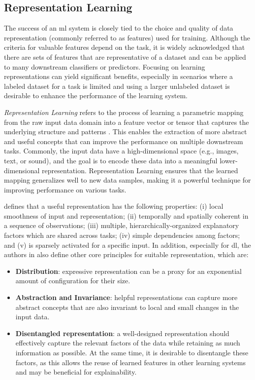 \subsection{Representation Learning}

The success of an \acs{ml} system is closely tied to the choice and quality of data representation (commonly referred to as features) used for training. Although the criteria for valuable features depend on the task, it is widely acknowledged that there are sets of features that are representative of a dataset and can be applied to many downstream classifiers or predictors. Focusing on learning representations can yield significant benefits, especially in scenarios where a labeled dataset for a task is limited and using a larger unlabeled dataset is desirable to enhance the performance of the learning system.

\textit{Representation Learning} refers to the process of learning a parametric mapping from the raw input data domain into a feature vector or tensor that captures the underlying structure and patterns \citep{le2020contrastive}. This enables the extraction of more abstract and useful concepts that can improve the performance on multiple downstream tasks. Commonly, the input data have a high-dimensional space (e.g., images, text, or sound), and the goal is to encode these data into a meaningful lower-dimensional representation. Representation Learning ensures that the learned mapping generalizes well to new data samples, making it a powerful technique for improving performance on various tasks.

\cite{bengio2013representation} defines that a useful representation has the following properties: (i) local smoothness of input and representation; (ii) temporally and spatially coherent in a sequence of observations; (iii) multiple, hierarchically-organized explanatory factors which are shared across tasks; (iv) simple dependencies among factors; and (v) is sparsely activated for a specific input. In addition, especially for \acl{dl}, the authors in \citep{le2020contrastive} also define other core principles for suitable representation, which are:

\begin{itemize}
\item \textbf{Distribution}: expressive representation can be a proxy for an exponential amount of configuration for their size.

\item \textbf{Abstraction and Invariance}: helpful representations can capture more abstract concepts that are also invariant to local and small changes in the input data.

\item \textbf{Disentangled representation}: a well-designed representation should effectively capture the relevant factors of the data while retaining as much information as possible. At the same time, it is desirable to disentangle these factors, as this allows the reuse of learned features in other learning systems and may be beneficial for explainability. 
\end{itemize}

